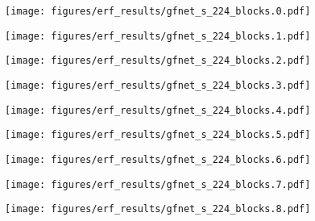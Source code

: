 \documentclass{article}
\begin{document}
\begin{figure}[tb]
  \raggedright
  \begin{minipage}[t]{0.13\hsize}
    \centering
    \texttt{[image: figures/erf\_results/gfnet\_s\_224\_blocks.0.pdf]}
    \label{figure:erf_gfnet:0}
  \end{minipage}
  \begin{minipage}[t]{0.13\hsize}
    \centering
    \texttt{[image: figures/erf\_results/gfnet\_s\_224\_blocks.1.pdf]}
    \label{figure:erf_gfnet:1}
  \end{minipage}
  \begin{minipage}[t]{0.13\hsize}
    \centering
    \texttt{[image: figures/erf\_results/gfnet\_s\_224\_blocks.2.pdf]}
    \label{figure:erf_gfnet:2}
  \end{minipage}
  \begin{minipage}[t]{0.13\hsize}
    \centering
    \texttt{[image: figures/erf\_results/gfnet\_s\_224\_blocks.3.pdf]}
    \label{figure:erf_gfnet:3}
  \end{minipage}
  \begin{minipage}[t]{0.13\hsize}
    \centering
    \texttt{[image: figures/erf\_results/gfnet\_s\_224\_blocks.4.pdf]}
    \label{figure:erf_gfnet:4}
  \end{minipage}
  \begin{minipage}[t]{0.13\hsize}
    \centering
    \texttt{[image: figures/erf\_results/gfnet\_s\_224\_blocks.5.pdf]}
    \label{figure:erf_gfnet:5}
  \end{minipage}
  \begin{minipage}[t]{0.13\hsize}
    \centering
    \texttt{[image: figures/erf\_results/gfnet\_s\_224\_blocks.6.pdf]}
    \label{figure:erf_gfnet:6}
  \end{minipage}
  \begin{minipage}[t]{0.13\hsize}
    \centering
    \texttt{[image: figures/erf\_results/gfnet\_s\_224\_blocks.7.pdf]}
    \label{figure:erf_gfnet:7}
  \end{minipage}
  \begin{minipage}[t]{0.13\hsize}
    \centering
    \texttt{[image: figures/erf\_results/gfnet\_s\_224\_blocks.8.pdf]}
    \label{figure:erf_gfnet:8}

\end{minipage}
\end{figure}
\end{document}
